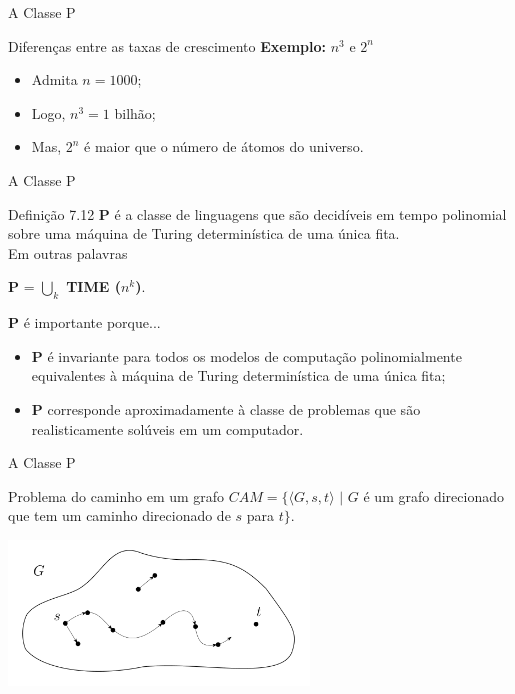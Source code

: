 \documentclass[xcolor=dvipsnames,table]{beamer}
\begin{document}
	\begin{frame}{A Classe P}
		\begin{block}{Diferenças entre as taxas de crescimento}
			{\bf Exemplo:} $n^3$ e $2^n$   
			\begin{itemize}
				\item Admita $n = 1000$;   
				\item Logo, $n^3 = 1$ bilhão;   
				\item Mas, $2^n$ é maior que o número de átomos do universo.
			\end{itemize}
		\end{block}
	\end{frame}
	
	\begin{frame}{A Classe P}
		\begin{block}{Definição 7.12}
			{\bf P} é a classe de linguagens que são decidíveis em tempo polinomial sobre uma máquina de Turing determinística de uma única fita. \\Em outras palavras
			\begin{center}
				{\bf P} = $\bigcup\limits_{k}$ {\bf TIME ($n^k$)}.
			\end{center}
		\end{block}
		\begin{block}{{\bf P} é importante porque...}
			\begin{itemize} 
				\item {\bf P} é invariante para todos os modelos de computação polinomialmente equivalentes à máquina de Turing determinística de uma única fita; 
				\item {\bf P} corresponde aproximadamente à classe de problemas que são realisticamente solúveis em um computador.
			\end{itemize}
		\end{block}
	\end{frame}
	
	\begin{frame}{A Classe P}
		\begin{block}{Problema do caminho em um grafo}
			$CAM = \{ \langle G, s, t \rangle \mbox{ | } G$ é um grafo direcionado que tem um caminho direcionado de $s$ para $t \}$.
		\end{block} 
		\begin{center}
			\includegraphics[width=8cm]{images/cam.png}
		\end{center}
	\end{frame}
	
\end{document}
